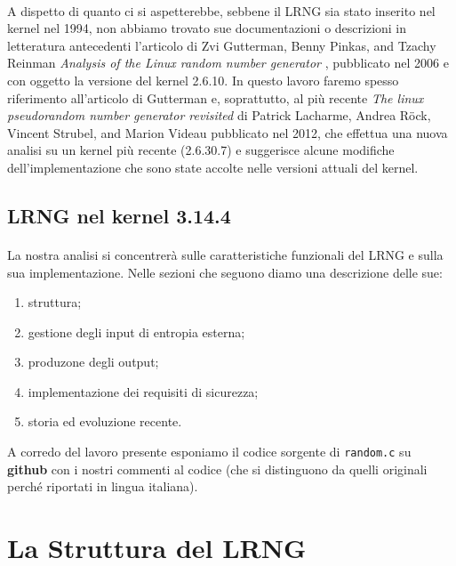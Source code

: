 \documentclass{article}
\begin{document}
\paragraph{}A dispetto di quanto ci si
aspetterebbe, sebbene il LRNG sia stato inserito nel kernel nel 1994, non
abbiamo trovato sue documentazioni o descrizioni in letteratura antecedenti
l'articolo di Zvi Gutterman, Benny Pinkas, and Tzachy Reinman \emph{Analysis of the Linux
random number generator} \cite{gutt}, pubblicato nel 2006 e con oggetto la
versione del kernel 2.6.10. In questo lavoro faremo spesso riferimento all'articolo di
Gutterman e, soprattutto, al più recente \emph{The linux pseudorandom number
generator revisited} di Patrick Lacharme, Andrea Röck, Vincent Strubel, and
Marion Videau \cite{lach}  pubblicato nel 2012, che effettua una nuova analisi
su un kernel più recente (2.6.30.7) e suggerisce alcune modifiche
dell'implementazione che sono state accolte nelle versioni attuali del kernel.

\subsection*{LRNG nel kernel 3.14.4}

\paragraph{}La nostra analisi si concentrerà sulle caratteristiche funzionali
del LRNG e sulla sua implementazione. Nelle sezioni che seguono diamo una
descrizione delle sue:
\begin{enumerate} 
  \item struttura;
  \item gestione degli input di entropia esterna;
  \item produzone degli output;
  \item implementazione dei requisiti di sicurezza; 
  \item storia ed evoluzione recente.
\end{enumerate}
A corredo del lavoro presente esponiamo il codice sorgente di \verb+random.c+ su
\textbf{github} \cite{kniz} con i nostri commenti al codice (che si distinguono
da quelli originali perché riportati in lingua italiana).

\section{La Struttura del LRNG}
  
\end{document}
